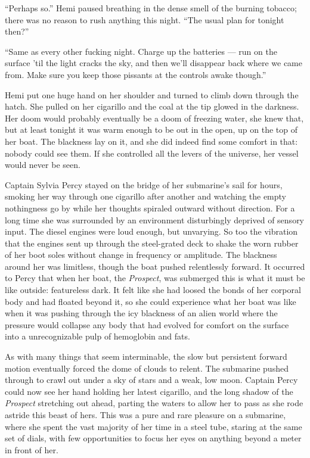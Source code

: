 \documentclass[
]{scrbook}
\begin{document}
``Perhaps so.'' Hemi paused breathing in the dense smell of the burning
tobacco; there was no reason to rush anything this night. ``The usual
plan for tonight then?''

``Same as every other fucking night. Charge up the batteries --- run on
the surface 'til the light cracks the sky, and then we'll disappear back
where we came from. Make sure you keep those pissants at the controls
awake though.''

Hemi put one huge hand on her shoulder and turned to climb down through
the hatch. She pulled on her cigarillo and the coal at the tip glowed in
the darkness. Her doom would probably eventually be a doom of freezing
water, she knew that, but at least tonight it was warm enough to be out
in the open, up on the top of her boat. The blackness lay on it, and she
did indeed find some comfort in that: nobody could see them. If she
controlled all the levers of the universe, her vessel would never be
seen.

\bigskip

Captain Sylvia Percy stayed on the bridge of her submarine's sail for
hours, smoking her way through one cigarillo after another and watching
the empty nothingness go by while her thoughts spiraled outward without
direction. For a long time she was surrounded by an environment
disturbingly deprived of sensory input. The diesel engines were loud
enough, but unvarying. So too the vibration that the engines sent up
through the steel-grated deck to shake the worn rubber of her boot soles
without change in frequency or amplitude. The blackness around her was
limitless, though the boat pushed relentlessly forward. It occurred to
Percy that when her boat, the \emph{Prospect}, was submerged this is
what it must be like outside: featureless dark. It felt like she had
loosed the bonds of her corporal body and had floated beyond it, so she
could experience what her boat was like when it was pushing through the
icy blackness of an alien world where the pressure would collapse any
body that had evolved for comfort on the surface into a unrecognizable
pulp of hemoglobin and fats.

As with many things that seem interminable, the slow but persistent
forward motion eventually forced the dome of clouds to relent. The
submarine pushed through to crawl out under a sky of stars and a weak,
low moon. Captain Percy could now see her hand holding her latest
cigarillo, and the long shadow of the \emph{Prospect} stretching out
ahead, parting the waters to allow her to pass as she rode astride this
beast of hers. This was a pure and rare pleasure on a submarine, where
she spent the vast majority of her time in a steel tube, staring at the
same set of dials, with few opportunities to focus her eyes on anything
beyond a meter in front of her.
\end{document}
